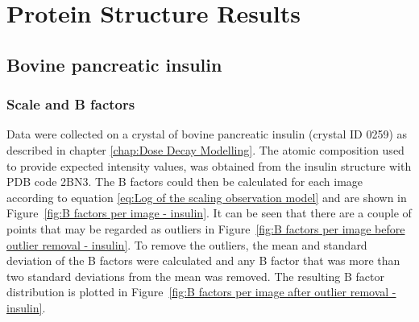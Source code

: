 \section{Protein Structure Results}
\label{sec:Protein Structure Results}

\subsection{Bovine pancreatic insulin}
\label{sub:Bovine pancreatic insulin}

\subsubsection{Scale and B factors}
\label{subs:Scale and B factors - insulin}
Data were collected on a crystal of bovine pancreatic insulin (crystal ID 0259) as described in chapter \ref{chap:Dose Decay Modelling}.
The atomic composition used to provide expected intensity values, was obtained from the insulin structure with PDB code 2BN3.
The B factors could then be calculated for each image according to equation \ref{eq:Log of the scaling observation model} and are shown in Figure~\ref{fig:B factors per image - insulin}.
It can be seen that there are a couple of points that may be regarded as outliers in Figure~\ref{fig:B factors per image before outlier removal - insulin}.
To remove the outliers, the mean and standard deviation of the B factors were calculated and any B factor that was more than two standard deviations from the mean was removed.
The resulting B factor distribution is plotted in Figure~\ref{fig:B factors per image after outlier removal - insulin}.
